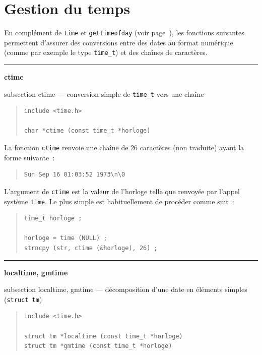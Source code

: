 \documentclass [twoside] {report}
\newcommand {\primitive} [1]
    {
	\phantomsection
	{\large \textbf {#1}}
	\addcontentsline {toc} {subsection} {#1}
    }
\newcommand {\separation}
    {
	\vspace {5mm}
	\nopagebreak
	\hrule
    }
\begin{document}


\section {Gestion du temps}
    \label {gestion-temps}

En complément de \texttt {time} et \texttt {gettimeofday} (voir
page~\pageref {time}), les fonctions suivantes permettent d'assurer des
conversions entre des dates au format numérique (comme par exemple le
type \texttt {time\_t}) et des chaînes de caractères.


\separation 
\primitive {ctime} --- conversion simple de \texttt {time\_t} vers une chaîne

\begin {quote}
\begin {verbatim}
include <time.h>

char *ctime (const time_t *horloge)
\end{verbatim}
\end {quote}

La fonction \texttt {ctime} renvoie une chaîne de 26 caractères
(non traduite) ayant la forme suivante~:
\begin {quote}
\begin {verbatim}
Sun Sep 16 01:03:52 1973\n\0
\end{verbatim}
\end {quote}
L'argument de \texttt {ctime} est la valeur de l'horloge telle
que renvoyée par l'appel système \texttt {time}. Le plus simple est
habituellement de procéder comme suit~:

\begin {quote}
\begin {verbatim}
time_t horloge ;

horloge = time (NULL) ;
strncpy (str, ctime (&horloge), 26) ;
\end{verbatim}
\end {quote}


\separation
\primitive {localtime, gmtime} --- décomposition d'une date en éléments simples (\texttt {struct tm})

\begin {quote}
\begin {verbatim}
include <time.h>

struct tm *localtime (const time_t *horloge)
struct tm *gmtime (const time_t *horloge)
\end{verbatim}
\end {quote}
\end{document}
